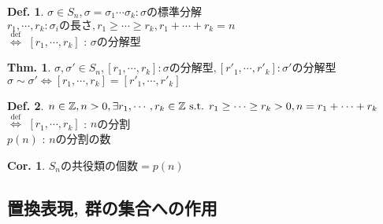 \documentclass[uplatex,dvipdfmx,9pt]{beamer}
\newcommand{\defarrow}{\overset{\mathrm{def}}{\Leftrightarrow}}
\newcommand{\st}{\text{ s.t. }}
\newcommand{\gt}{\ensuremath >}
\newcounter{textThmCount}
\newcounter{textExmCount}
\theoremstyle{definition} %
\newtheorem{defn}{Def.}[subsection] %
\newtheorem{thmText}[textThmCount]{Thm.}
\newtheorem{corText}{Cor.}[textThmCount] %
\theoremstyle{example}
\begin{document}
      \begin{frame}

        \begin{defn}
          $\sigma \in S_n, \sigma = \sigma_1 \cdots \sigma_k : \text{$\sigma$の標準分解}$ \\
          $r_1, \cdots, r_k : \text{$\sigma_i$の長さ}, r_1 \ge \cdots \ge r_k, r_1 + \cdots + r_k = n$ \\
          $\defarrow$ $[r_1, \cdots, r_k]$ : $\sigma$の\alert{分解型}
        \end{defn}

        \begin{thmText}
          $\sigma, \sigma' \in S_n, [r_1, \cdots, r_k] : \text{$\sigma$の分解型}, [r'_1, \cdots, r'_k] : \text{$\sigma'$の分解型}$ \\
          $\sigma \sim \sigma' \Leftrightarrow [r_1, \cdots, r_k] = [r'_1, \cdots, r'_k]$
        \end{thmText}

        \begin{defn}
          $n \in \mathbb{Z}, n \gt 0, \exists r_1, \cdots, r_k \in \mathbb{Z} \st r_1 \ge \cdots \ge r_k \gt 0, n = r_1 + \cdots + r_k$ \\
          $\defarrow$ $[r_1, \cdots, r_k]$ : $n$の\alert{分割} \\
          $p(n)$ : $n$の分割の数
        \end{defn}

        \begin{corText}
          $\text{$S_n$の共役類の個数} = p(n)$
        \end{corText}
        
      \end{frame}

    \subsection{\textsection \thesubsection 置換表現, 群の集合への作用}
    \setcounter{textExmCount}{0}
\end{document}
